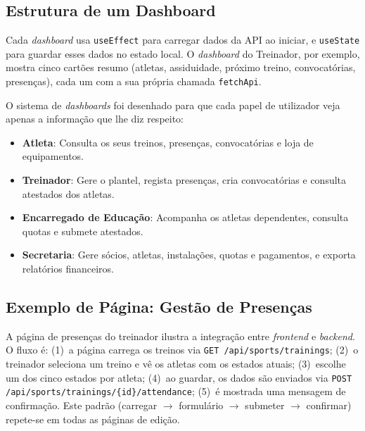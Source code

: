 \subsection{Estrutura de um Dashboard}

Cada \textit{dashboard} usa \texttt{useEffect} para carregar dados da API ao iniciar, e \texttt{useState} para guardar esses dados no estado local. O \textit{dashboard} do Treinador, por exemplo, mostra cinco cartões resumo (atletas, assiduidade, próximo treino, convocatórias, presenças), cada um com a sua própria chamada \texttt{fetchApi}.

O sistema de \textit{dashboards} foi desenhado para que cada papel de utilizador veja apenas a informação que lhe diz respeito:

\begin{itemize}
    \item \textbf{Atleta}: Consulta os seus treinos, presenças, convocatórias e loja de equipamentos.
    \item \textbf{Treinador}: Gere o plantel, regista presenças, cria convocatórias e consulta atestados dos atletas.
    \item \textbf{Encarregado de Educação}: Acompanha os atletas dependentes, consulta quotas e submete atestados.
    \item \textbf{Secretaria}: Gere sócios, atletas, instalações, quotas e pagamentos, e exporta relatórios financeiros.
\end{itemize}

\subsection{Exemplo de Página: Gestão de Presenças}

A página de presenças do treinador ilustra a integração entre \textit{frontend} e \textit{backend}. O fluxo é: (1)~a página carrega os treinos via \texttt{GET /api/sports/trainings}; (2)~o treinador seleciona um treino e vê os atletas com os estados atuais; (3)~escolhe um dos cinco estados por atleta; (4)~ao guardar, os dados são enviados via \texttt{POST /api/sports/trainings/\{id\}/attendance}; (5)~é mostrada uma mensagem de confirmação. Este padrão (carregar $\rightarrow$ formulário $\rightarrow$ submeter $\rightarrow$ confirmar) repete-se em todas as páginas de edição.


